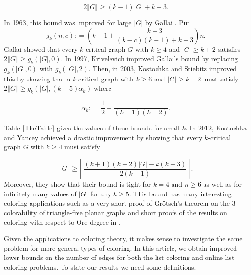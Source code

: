 \documentclass[10pt]{article}
\theoremstyle{plain}
\theoremstyle{definition}
\theoremstyle{remark}
\newcommand{\card}[1]{\left|#1\right|}
\newcommand{\size}[1]{\left\Vert#1\right\Vert}
\newcommand{\ceil}[1]{\left\lceil#1\right\rceil}
\newcommand{\parens}[1]{\left( #1 \right)}
\newcommand{\DefinedAs}{\mathrel{\mathop:}=}
\begin{document}
\[2\size{G} \ge (k-1)\card{G} + k-3.\]

In 1963, this bound was improved for large $\card{G}$ by Gallai \cite{gallai1963kritische}.  Put 
\[g_k(n, c) \DefinedAs \parens{k-1 + \frac{k-3}{(k-c)(k-1) + k-3}}n.\]
Gallai showed that every $k$-critical graph $G$ with $k \ge 4$ and $\card{G} \ge k+2$ satisfies $2\size{G} \ge g_k(\card{G}, 0)$.  In 1997, Krivelevich \cite{krivelevich1997minimal} improved Gallai's bound by replacing $g_k(\card{G}, 0)$ with $g_k(\card{G}, 2)$.  Then, in 2003, Kostochka and Stiebitz \cite{kostochkastiebitzedgesincriticalgraph} improved this by showing that a $k$-critical graph with $k \ge 6$ and $\card{G} \ge k+2$ must satisfy $2\size{G} \ge g_k(\card{G}, (k-5)\alpha_k)$ where

\[\alpha_k \DefinedAs \frac12 - \frac{1}{(k-1)(k-2)}.\]

Table \ref{TheTable} gives the values of these bounds for small $k$.  In 2012, Kostochka and Yancey \cite{kostochkayancey2012ore} achieved a drastic improvement by showing that every $k$-critical graph $G$ with $k \ge 4$ must satisfy

\[\size{G} \ge \ceil{\frac{(k+1)(k-2)\card{G} - k(k-3)}{2(k-1)}}.\]%
Moreover, they show that their bound is tight for $k=4$ and $n \ge 6$ as well as for infinitely many values of $\card{G}$ for any $k \ge 5$.  This bound has many interesting coloring applications such as a very short proof of Gr\"otsch's theorem on the $3$-colorability of triangle-free planar graphs \cite{kostochka2012oregrotsch} and short proofs of the results on coloring with respect to Ore degree in \cite{kierstead2009ore, rabern2010a, krs_one}.  %

Given the applications to coloring theory, it makes sense to investigate the same problem for more general types of coloring.  In this article, we obtain improved lower bounds on the number of edges for both the list coloring and online list coloring problems.  To state our results we need some definitions.
\end{document}
